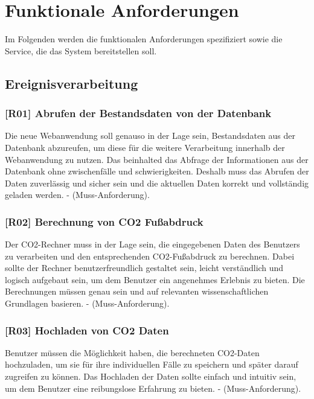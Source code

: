 \section{Funktionale Anforderungen}
\label{chapter:3-section:funktionale-anforderungen}

Im Folgenden werden die funktionalen Anforderungen spezifiziert sowie die Service, die das System bereitstellen soll.

\subsection{Ereignisverarbeitung}

\subsubsection{[R01] Abrufen der Bestandsdaten von der Datenbank}

Die neue Webanwendung soll genauso in der Lage sein, Bestandsdaten aus der Datenbank abzureufen, um diese für die weitere Verarbeitung innerhalb der Webanwendung zu nutzen. Das beinhalted das Abfrage der Informationen aus der Datenbank ohne zwischenfälle und schwierigkeiten. Deshalb muss das Abrufen der Daten zuverlässig und sicher sein und die aktuellen Daten korrekt und vollständig geladen werden. - (Muss-Anforderung).

\subsubsection{[R02] Berechnung von CO2 Fußabdruck}

Der CO2-Rechner muss in der Lage sein, die eingegebenen Daten des Benutzers zu verarbeiten und den entsprechenden CO2-Fußabdruck zu berechnen. Dabei sollte der Rechner benutzerfreundlich gestaltet sein, leicht verständlich und logisch aufgebaut sein, um dem Benutzer ein angenehmes Erlebnis zu bieten. Die Berechnungen müssen genau sein und auf relevanten wissenschaftlichen Grundlagen basieren. - (Muss-Anforderung).

\subsubsection{[R03] Hochladen von CO2 Daten}

Benutzer müssen die Möglichkeit haben, die berechneten CO2-Daten hochzuladen, um sie für ihre individuellen Fälle zu speichern und später darauf zugreifen zu können. Das Hochladen der Daten sollte einfach und intuitiv sein, um dem Benutzer eine reibungslose Erfahrung zu bieten. - (Muss-Anforderung).

